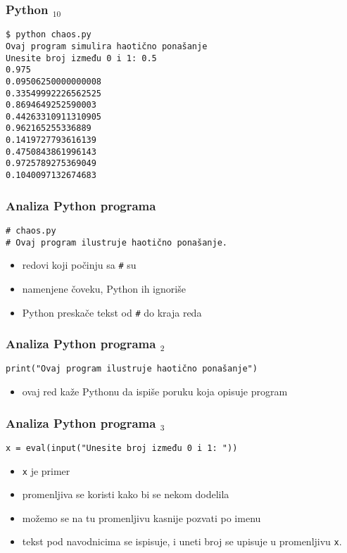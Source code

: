 \documentclass[utf8,compress]{beamer}
\begin{document}
\begin{frame}[fragile]
\frametitle{Python $_{10}$}
\begin{verbatim}
$ python chaos.py
Ovaj program simulira haotično ponašanje
Unesite broj između 0 i 1: 0.5
0.975
0.09506250000000008
0.33549992226562525
0.8694649252590003
0.44263310911310905
0.962165255336889
0.1419727793616139
0.4750843861996143
0.9725789275369049
0.1040097132674683
\end{verbatim}
\end{frame}

\begin{frame}[fragile]
\frametitle{Analiza Python programa}
\begin{verbatim}
# chaos.py
# Ovaj program ilustruje haotično ponašanje.
\end{verbatim}
\begin{itemize}
  \item redovi koji počinju sa \texttt{\#} su 
  \item namenjene čoveku, Python ih ignoriše
  \item Python preskače tekst od \texttt{\#} do kraja reda
\end{itemize}
\end{frame}

\begin{frame}[fragile]
\frametitle{Analiza Python programa $_2$}
\begin{verbatim}
print("Ovaj program ilustruje haotično ponašanje")
\end{verbatim}
\begin{itemize}
  \item ovaj red kaže Pythonu da ispiše poruku koja opisuje program
\end{itemize}
\end{frame}

\begin{frame}[fragile]
\frametitle{Analiza Python programa $_3$}
\begin{verbatim}
x = eval(input("Unesite broj između 0 i 1: "))
\end{verbatim}
\begin{itemize}
  \item \texttt{x} je primer 
  \item promenljiva se koristi kako bi se nekom  dodelila 
  \item možemo se na tu promenljivu kasnije pozvati po imenu
  \item tekst pod navodnicima se ispisuje, i uneti broj se upisuje u promenljivu \texttt{x}.
\end{itemize}
\end{frame}
\end{document}
